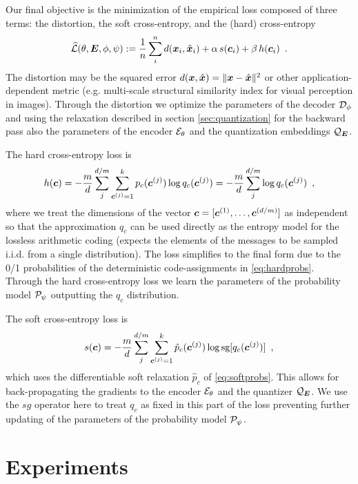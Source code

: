 \documentclass{article} %
\newcommand{\Lsh}{\widehat{\Ls}}
\newcommand{\pc}{p_c}
\newcommand{\qc}{q_c}
\newcommand{\gEt}{\gE_\theta}
\newcommand{\gQE}{\gQ_\mE}
\newcommand{\gDp}{\gD_\phi}
\newcommand{\vxh}{\hat{\vx}}
\newcommand{\gPp}{\gP_{\psi}}
\begin{document}
Our final objective is the minimization of the empirical loss composed of three terms: the distortion, the soft cross-entropy, and the (hard) cross-entropy
\begin{align}\label{eq:loss_final}
\Lsh(\theta, \mE, \phi, \psi) := \frac{1}{n}\sum_i^n d(\vx_i, \vxh_i) + \alpha \, s(\vc_i) + \beta \, h(\vc_i) \enspace .
\end{align}
The distortion may be the squared error $d(\vx, \vxh) = \Vert \vx - \vxh \Vert^2$ or other application-dependent metric (e.g. multi-scale structural similarity index for visual perception in images).
Through the distortion we optimize the parameters of the decoder $\gDp$ and using the relaxation described in section \ref{sec:quantization} for the backward pass also the parameters of the encoder $\gEt$ and the quantization embeddings $\gQE$.

The hard cross-entropy loss is
\begin{align}
h(\vc) = - \frac{m}{d} \sum_j^{d/m} \sum_{\vc^{(j)} = 1}^k \pc(\vc^{(j)}) \log \qc(\vc^{(j)})
= - \frac{m}{d} \sum_j^{d/m} \log \qc(\vc^{(j)}) \enspace ,
\end{align}
where we treat the dimensions of the vector ${\bm{c}} = [{\bm{c}}^{(1)}, \ldots, {\bm{c}}^{(d/m)}]$ as independent so that the approximation $\qc$ can be used directly as the entropy model for the lossless arithmetic coding (expects the elements of the messages to be sampled i.i.d. from a single distribution).
The loss simplifies to the final form due to the 0/1 probabilities of the deterministic code-assignments in \eqref{eq:hardprobs}.
Through the hard cross-entropy loss we learn the parameters of the probability model $\gPp$ outputting the $\qc$ distribution.

The soft cross-entropy loss is
\begin{align}
s(\vc) = - \frac{m}{d} \sum_j^{d/m} \sum_{\vc^{(j)} = 1}^k \hat{p}_c(\vc^{(j)}) \log \textrm{sg}[\qc(\vc^{(j)})] \enspace ,
\end{align}
which uses the differentiable soft relaxation $\hat{p}_c$ of \eqref{eq:softprobs}. 
This allows for back-propagating the gradients to the encoder $\gEt$ and the quantizer $\gQE$. 
We use the $sg$ operator here to treat $\qc$ as fixed in this part of the loss preventing further updating of the parameters of the probability model $\gPp$.


\section{Experiments}
\end{document}
